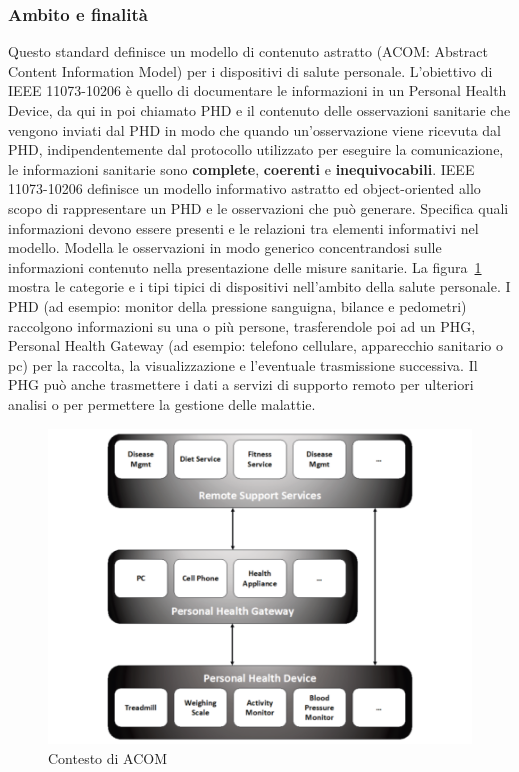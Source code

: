 \documentclass[a4paper]{article}
\begin{document}
\subsubsection{Ambito e finalità}
Questo standard definisce un modello di contenuto astratto (ACOM: Abstract Content Information Model) per i dispositivi di salute personale.
L'obiettivo di IEEE 11073-10206 è quello di documentare le informazioni in un Personal Health Device, da qui in poi chiamato PHD e il contenuto delle osservazioni sanitarie che vengono inviati dal PHD in modo che quando un'osservazione viene ricevuta dal PHD, indipendentemente dal protocollo utilizzato per eseguire
la comunicazione, le informazioni sanitarie sono \textbf{complete}, \textbf{coerenti} e \textbf{inequivocabili}.
IEEE 11073-10206 definisce un modello informativo astratto ed object-oriented allo scopo di rappresentare un PHD e le osservazioni che può generare.
Specifica quali informazioni devono essere presenti e le relazioni tra elementi informativi nel modello. Modella le osservazioni in modo generico
concentrandosi sulle informazioni contenuto nella presentazione delle misure sanitarie.
La figura~\ref{fig:overallContextOfWork} mostra le categorie e i tipi tipici di dispositivi nell'ambito della salute personale. I PHD (ad esempio: monitor della pressione sanguigna, bilance e pedometri) raccolgono informazioni su una o più persone, trasferendole poi ad un PHG, Personal Health Gateway (ad esempio: telefono cellulare, apparecchio sanitario o pc) per la raccolta, la visualizzazione e l'eventuale trasmissione successiva. Il PHG può anche trasmettere i dati a servizi di supporto remoto per ulteriori analisi o per permettere la gestione delle malattie.

\begin{figure}[H]
    \centering
    \includegraphics[width=1\textwidth]{figures/overall context of work.png}
    \caption{Contesto di ACOM}
    \label{fig:overallContextOfWork}
\end{figure}
\end{document}
